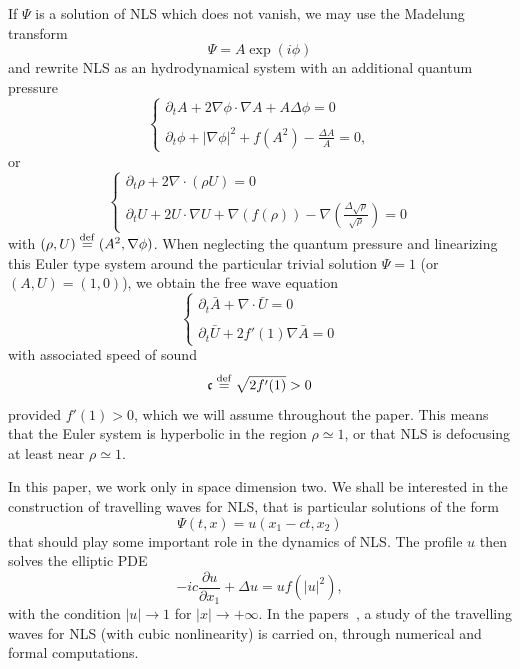 \documentclass[10pt]{amsart}
\theoremstyle{definition}\newtheorem{defi}[theo]{Definition}\newtheorem{rema}[theo]{Remark}\newtheorem{exam}[theo]{Example}\newtheorem{exem}[theo]{Example}\newtheorem{nota}[theo]{Notation}
\newcommand*\p{\partial}
\newcommand*\ddef{\stackrel{\rm def}{=}}
\newcommand*\ds{\displaystyle}
\newcommand*\cs{{\mathfrak c}}
\newcommand*\ii{\infty}
\begin{document}
If $\Psi$ is a solution of NLS which does not vanish, we may use the Madelung transform
\[
\Psi = A \exp(i \phi)
\]
and rewrite NLS as an hydrodynamical system with an additional quantum pressure
\begin{equation}\label{Madelo}
\begin{cases}
\ds{ \p_t A + 2 \nabla \phi \cdot \nabla A + A \Delta \phi } = 0 \\ \ \\
\ds{ \p_{t} \phi + |\nabla \phi|^2 + f (A^2) - \frac{ \Delta A }{A} } = 0,
\end{cases}
\end{equation} or
\[
\begin{cases}
\ds{ \p_t \rho + 2 \nabla \cdot (\rho U) } = 0 \\ \ \\
\ds{ \p_{t} U + 2 U \cdot \nabla U + \nabla (f (\rho)) - \nabla \left(\frac{ \Delta \sqrt{\rho} }{\sqrt{\rho}} \right) } = 0
\end{cases}
\]
with $(\rho,U) \ddef (A^2,\nabla \phi)$. When neglecting the quantum pressure and linearizing this Euler type system around the particular trivial solution $\Psi = 1$ (or $(A,U)= (1,0)$), we obtain the free wave equation
\[
\begin{cases}
\ds{ \p_t \bar{A} + \nabla \cdot \bar{U} } = 0 \\ \ \\
\ds{ \p_{t} \bar{U} + 2 f'(1) \nabla \bar{A} } = 0
\end{cases}
\]
with associated speed of sound
\[
\cs \ddef \sqrt{ 2 f'(1)} > 0
\]
provided $f'(1) > 0 $, which we will assume throughout the paper. This means that the Euler system is hyperbolic in the region $ \rho \simeq 1$, or that NLS is defocusing at least near $ \rho \simeq 1$.

In this paper, we work only in space dimension two. We shall be interested in the construction of travelling waves for NLS, that is particular solutions of the form
\[
\Psi (t,x) = u (x_1 -c t,x_2)
\]
that should play some important role in the dynamics of NLS. The profile $ u $ then solves the elliptic PDE
\begin{equation}
\tag{TW$_c$} - i c \frac{\p u}{\p x_1} + \Delta u = u f\left(|u|^2\right),
\end{equation}
with the condition $ |u | \to 1 $ for $ |x| \to +\ii $. In the papers~\cite{JR,JPR}, a study of the travelling waves for NLS (with cubic nonlinearity) is carried on, through numerical and formal computations.
\end{document}
